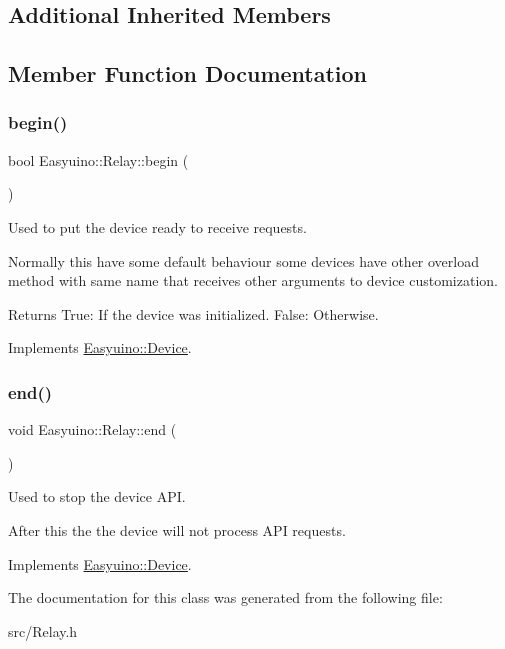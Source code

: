 \subsection*{Additional Inherited Members}


\subsection{Member Function Documentation}
\mbox{\label{class_easyuino_1_1_relay_a920a0fa287cacfd8c6df19d8812d4958}} 
\subsubsection{\texorpdfstring{begin()}{begin()}}
{\footnotesize\ttfamily bool Easyuino\+::\+Relay\+::begin (\begin{DoxyParamCaption}{ }\end{DoxyParamCaption})\hspace{0.3cm}{\ttfamily [virtual]}}



Used to put the device ready to receive requests. 

Normally this have some default behaviour some devices have other overload method with same name that receives other arguments to device customization. \begin{DoxyReturn}{Returns}
True\+: If the device was initialized. False\+: Otherwise. 
\end{DoxyReturn}


Implements \hyperlink{class_easyuino_1_1_device_a2e7bb2fec849719a9d9432b57cdb72ba}{Easyuino\+::\+Device}.

\mbox{\label{class_easyuino_1_1_relay_a2b57237c996a6ffe8e900ae273bce9d4}} 
\subsubsection{\texorpdfstring{end()}{end()}}
{\footnotesize\ttfamily void Easyuino\+::\+Relay\+::end (\begin{DoxyParamCaption}{ }\end{DoxyParamCaption})\hspace{0.3cm}{\ttfamily [virtual]}}



Used to stop the device A\+PI. 

After this the the device will not process A\+PI requests. 

Implements \hyperlink{class_easyuino_1_1_device_ab31018ef64adc84aa2ea575b2297548f}{Easyuino\+::\+Device}.



The documentation for this class was generated from the following file\+:\begin{DoxyCompactItemize}
\item 
src/Relay.\+h\end{DoxyCompactItemize}
